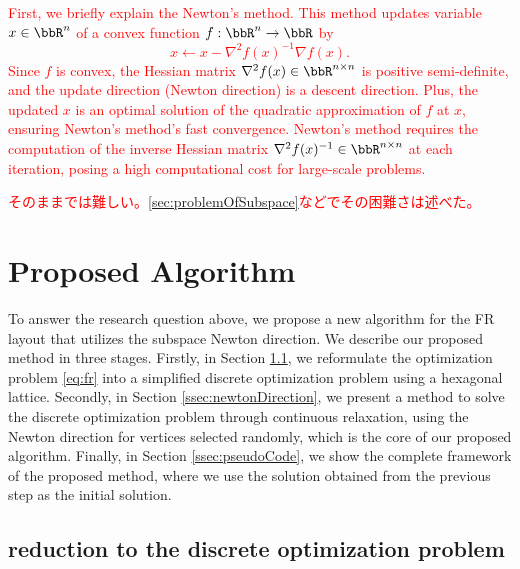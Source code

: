 \documentclass[dvipdfmx,journal]{IEEEtran}
\newcommand{\red}[1]{\textcolor{red}{#1}}
\begin{document}
\red{
  First, we briefly explain the Newton's method.
  This method updates variable $x \in \bbR^n$ of a convex function $f: \bbR^n \to \bbR$ by
  \begin{equation*}
    x \gets x - \nabla^2 f(x)^{-1} \nabla f(x).
  \end{equation*}
  Since $f$ is convex, the Hessian matrix $\nabla^2 f(x) \in \bbR^{n \times n}$ is positive semi-definite, and the update direction (Newton direction) is a descent direction. Plus, the updated $x$ is an optimal solution of the quadratic approximation of $f$ at $x$, ensuring Newton's method's fast convergence.
  Newton's method requires the computation of the inverse Hessian matrix $\nabla^2 f(x)^{-1} \in \bbR^{n \times n}$ at each iteration, posing a high computational cost for large-scale problems.
}

\red{
  そのままでは難しい。\ref{sec:problemOfSubspace}などでその困難さは述べた。
}

\section{Proposed Algorithm}\label{sec:algorithm}

To answer the research question above, we propose a new algorithm for the FR layout that utilizes the subspace Newton direction.
We describe our proposed method in three stages.
Firstly, in Section \ref{ssec:reduction}, we reformulate the optimization problem \eqref{eq:fr} into a simplified discrete optimization problem using a hexagonal lattice.
Secondly, in Section \ref{ssec:newtonDirection}, we present a method to solve the discrete optimization problem through continuous relaxation, using the Newton direction for vertices selected randomly, which is the core of our proposed algorithm.
Finally, in Section \ref{ssec:pseudoCode}, we show the complete framework of the proposed method, where we use the solution obtained from the previous step as the initial solution.

\subsection{reduction to the discrete optimization problem}\label{ssec:reduction}
\end{document}
